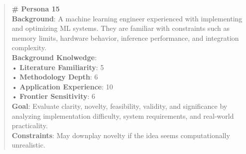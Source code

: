 \begin{quote}
\begin{tcolorbox}[breakable,colback=persona!20!white, colframe=persona!60!black, title=\textbf{Personas}]
        \textbf{\# Persona 15}\\
        \textbf{Background}: A machine learning engineer experienced with implementing and optimizing ML systems. They are familiar with constraints such as memory limits, hardware behavior, inference performance, and integration complexity.\\
        \textbf{Background Knolwedge}:\\
        • \textbf{Literature Familiarity}: 5\\
        • \textbf{Methodology Depth}: 6\\
        • \textbf{Application Experience}: 10\\
        • \textbf{Frontier Sensitivity}: 6\\
        \textbf{Goal}: Evaluate clarity, novelty, feasibility, validity, and significance by analyzing implementation difficulty, system requirements, and real-world practicality.\\
        \textbf{Constraints}: May downplay novelty if the idea seems computationally unrealistic.
    \end{tcolorbox}
\end{quote}